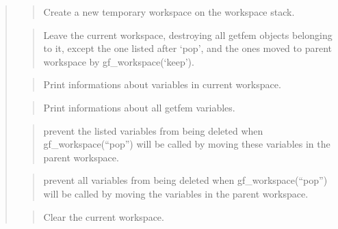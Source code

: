 \documentclass[a4paper,11pt,english]{sphinxmanual}
\begin{document}
\begin{quote}

\begin{quote}

Create a new temporary workspace on the workspace stack.
\end{quote}

\begin{quote}

Leave the current workspace, destroying all getfem objects
belonging to it, except the one listed after ‘pop’, and the ones
moved to parent workspace by gf\_workspace(‘keep’).
\end{quote}

\begin{quote}

Print informations about variables in current workspace.
\end{quote}

\begin{quote}

Print informations about all getfem variables.
\end{quote}

\begin{quote}

prevent the listed variables from being deleted when
gf\_workspace(“pop”) will be called by moving these variables in the
parent workspace.
\end{quote}

\begin{quote}

prevent all variables from being deleted when
gf\_workspace(“pop”) will be called by moving the variables in the
parent workspace.
\end{quote}

\begin{quote}

Clear the current workspace.
\end{quote}


\end{quote}
\end{document}
